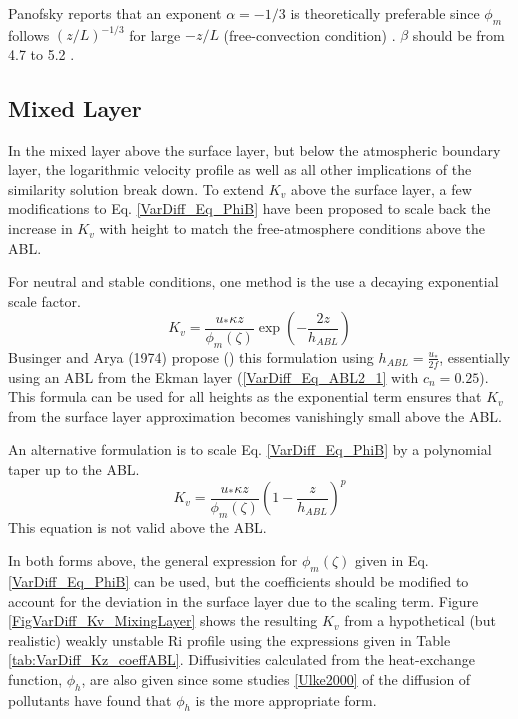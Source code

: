 Panofsky reports that an exponent $\alpha=-1/3$ is theoretically preferable
since $\phi_m$ follows $(z/L)^{-1/3}$ for large $-z/L$ (free-convection condition) \cite[p.134]{Panofsky1984}.
$\beta$ should be from 4.7 to 5.2 \cite[p.136]{Panofsky1984}.

\subsection{Mixed Layer}
In the mixed layer above the surface layer, but below the atmospheric boundary layer,
the logarithmic velocity profile as well as all other implications of the similarity
solution break down. To extend $K_v$ above the surface layer, a few modifications to
Eq. \ref{VarDiff_Eq_PhiB} have been proposed to scale back the increase in $K_v$ with
height to match the free-atmosphere conditions above the ABL.

For neutral and stable conditions, one method is the use a decaying exponential scale
factor.
\begin{equation}\label{VarDiff_Eq_Kz_Mixed_Exp}
K_v = \frac{u_{*} \kappa z}{\phi_m(\zeta)} \exp \left( -\frac{2 z}{h_{ABL}} \right)
\end{equation}
Businger and Arya (1974) propose (\cite[p.872]{Seinfeld2006})
this formulation using $h_{ABL}=\frac{u_*}{2 f}$, essentially
using an ABL from the Ekman layer (\ref{VarDiff_Eq_ABL2_1} with $c_n=0.25$).
This formula can be used for all heights as the exponential
term ensures that $K_v$ from the surface layer approximation becomes vanishingly
small above the ABL.

An alternative formulation is to scale Eq. \ref{VarDiff_Eq_PhiB} by a polynomial taper
up to the ABL.
\begin{equation}\label{VarDiff_Eq_Kz_Mixed_Poly}
K_v = \frac{u_{*} \kappa z}{\phi_m(\zeta)} \left( 1-\frac{z}{h_{ABL}} \right)^p
\end{equation}
This equation is not valid above the ABL.

In both forms above, the general expression for $\phi_m(\zeta)$ given in Eq. \ref{VarDiff_Eq_PhiB}
can be used, but the coefficients should be modified to account for the deviation in the
surface layer due to the scaling term. Figure \ref{FigVarDiff_Kv_MixingLayer} shows the resulting
$K_v$ from a hypothetical (but realistic) weakly unstable $\mathrm{Ri}$ profile using the expressions
given in Table \ref{tab:VarDiff_Kz_coeffABL}. Diffusivities calculated from the heat-exchange 
function, $\phi_h$, are also given since some studies \ref{Ulke2000} of the diffusion of pollutants
have found that $\phi_h$ is the more appropriate form.

